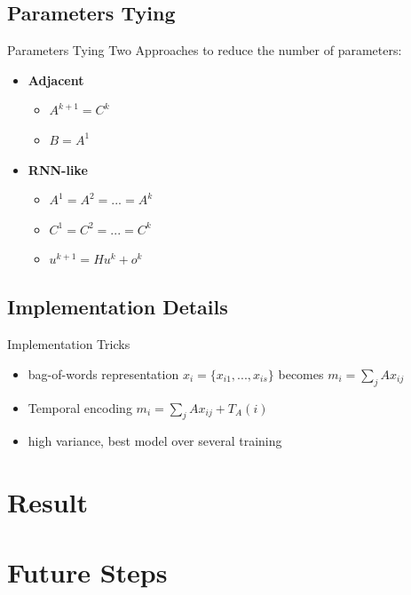 \documentclass[pdf]{beamer}
\begin{document}
\subsection{Parameters Tying}

\begin{frame}{Parameters Tying}
Two Approaches to reduce the number of parameters:

\begin{itemize}
	\item \textbf{Adjacent}
		\begin{itemize}
			\item $A^{k+1} = C^{k}$
			\item $B = A^1$
		\end{itemize}
	\item \textbf{RNN-like}
		\begin{itemize}
			\item $A^1 = A^2 = ... = A^k$
			\item $C^1 = C^2 = ... = C^k$
			\item $u^{k+1} = Hu^k + o^k$
		\end{itemize}
\end{itemize}

\end{frame}

\subsection{Implementation Details}

\begin{frame}{Implementation Tricks}
\begin{itemize}
	\item bag-of-words representation $x_i = \{x_{i1}, ..., x_{is}\}$ becomes $m_i = \sum_j Ax_{ij}$
	\item Temporal encoding $m_i = \sum_j Ax_{ij} + T_A(i)$
	\item high variance, best model over several training
\end{itemize}	
\end{frame}

\section{Result}


\section{Future Steps}
\end{document}
